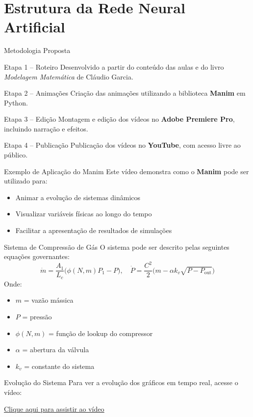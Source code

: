 \section{Estrutura da Rede Neural Artificial}

\begin{frame}{Metodologia Proposta}

\begin{block}{Etapa 1 – Roteiro}
Desenvolvido a partir do conteúdo das aulas e do livro \textit{Modelagem Matemática} de Cláudio Garcia.
\end{block}

\begin{block}{Etapa 2 – Animações}
Criação das animações utilizando a biblioteca \textbf{Manim} em Python.
\end{block}

\begin{block}{Etapa 3 – Edição}
Montagem e edição dos vídeos no \textbf{Adobe Premiere Pro}, incluindo narração e efeitos.
\end{block}

\begin{block}{Etapa 4 – Publicação}
Publicação dos vídeos no \textbf{YouTube}, com acesso livre ao público.
\end{block}

\end{frame}

\begin{frame}{Exemplo de Aplicação do Manim}
    Este vídeo demonstra como o \textbf{Manim} pode ser utilizado para:
    \begin{itemize}
        \item Animar a evolução de sistemas dinâmicos
        \item Visualizar variáveis físicas ao longo do tempo
        \item Facilitar a apresentação de resultados de simulações
    \end{itemize}
\end{frame}

\begin{frame}{Sistema de Compressão de Gás}
    O sistema pode ser descrito pelas seguintes equações governantes:
    \[
    \dot{m} = \frac{A_1}{L_c} \Big(\phi(N,m) P_1 - P \Big), \quad
    \dot{P} = \frac{C^2}{2} \Big( m - \alpha k_v \sqrt{P - P_\text{out}} \Big)
    \]
    Onde:
    \begin{itemize}
        \item $m$ = vazão mássica
        \item $P$ = pressão
        \item $\phi(N,m)$ = função de lookup do compressor
        \item $\alpha$ = abertura da válvula
        \item $k_v$ = constante do sistema
    \end{itemize}
\end{frame}

\begin{frame}{Evolução do Sistema}
    Para ver a evolução dos gráficos em tempo real, acesse o vídeo:
    
    \vspace{0.5cm}
    \href{https://youtu.be/ruMYnqg-1yk}{\color{blue}\underline{Clique aqui para assistir ao vídeo}}
\end{frame}